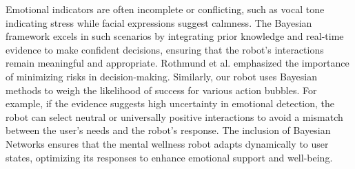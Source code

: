 Emotional indicators are often incomplete or conflicting, such as vocal tone indicating stress while facial expressions suggest calmness. The Bayesian framework excels in such scenarios by integrating prior knowledge and real-time evidence to make confident decisions, ensuring that the robot’s interactions remain meaningful and appropriate. Rothmund et al. \cite{rothmund2021bayesian} emphasized the importance of minimizing risks in decision-making. Similarly, our robot uses Bayesian methods to weigh the likelihood of success for various action bubbles. For example, if the evidence suggests high uncertainty in emotional detection, the robot can select neutral or universally positive interactions to avoid a mismatch between the user’s needs and the robot’s response. The inclusion of Bayesian Networks ensures that the mental wellness robot adapts dynamically to user states, optimizing its responses to enhance emotional support and well-being.